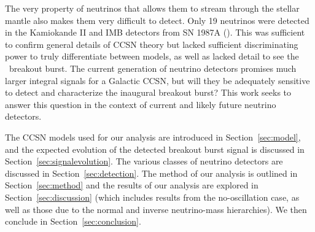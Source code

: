The very property of neutrinos that allows them to stream through the
stellar mantle also makes them very difficult to detect. Only 19
neutrinos were detected in the Kamiokande II and IMB detectors from SN
1987A (\citealp{bionta1987,hirata1987}). This was sufficient to confirm
general details of CCSN theory but lacked sufficient discriminating
power to 
truly differentiate between models, as well as lacked detail to see
the \nue\ breakout burst.  The current generation of neutrino
detectors promises much larger integral signals for a Galactic CCSN,
but will they be adequately sensitive to detect and characterize the
inaugural breakout burst?
This work seeks to answer this question in the context of
current and likely future neutrino detectors.

The CCSN
models used for our analysis are introduced in
Section~\ref{sec:model}, and the expected evolution of
the detected breakout burst signal is discussed in
Section~\ref{sec:signalevolution}.
The various classes of 
neutrino detectors are
discussed in Section~\ref{sec:detection}. The method of our analysis is
outlined in Section~\ref{sec:method} and the results
of our analysis are explored in Section~\ref{sec:discussion} (which
includes results from the no-oscillation case, as well as
those due to the normal and inverse neutrino-mass hierarchies).
We then conclude in 
Section~\ref{sec:conclusion}.
